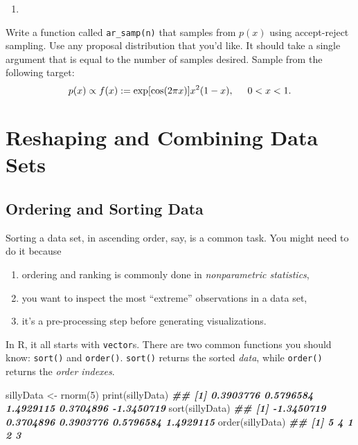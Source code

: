 \documentclass[
  12pt,
  krantz2]{krantz}
\makeatletter
\newenvironment{Shaded}{\begin{snugshade}}{\end{snugshade}}
\newcommand{\DecValTok}[1]{\textcolor[rgb]{0.06,0.06,0.06}{#1}}
\newcommand{\DocumentationTok}[1]{\textcolor[rgb]{0.37,0.37,0.37}{\textbf{\textit{#1}}}}
\newcommand{\FunctionTok}[1]{\textcolor[rgb]{0,0,0}{#1}}
\newcommand{\NormalTok}[1]{#1}
\newcommand{\OtherTok}[1]{\textcolor[rgb]{0.37,0.37,0.37}{#1}}
\providecommand{\tightlist}{%
  \setlength{\itemsep}{0pt}\setlength{\parskip}{0pt}}
\newenvironment{kframe}{%
\medskip{}
\setlength{\fboxsep}{.8em}
 \def\at@end@of@kframe{}%
 \ifinner\ifhmode%
  \def\at@end@of@kframe{\end{minipage}}%
  \begin{minipage}{\columnwidth}%
 \fi\fi%
 \def\FrameCommand##1{\hskip\@totalleftmargin \hskip-\fboxsep
 \colorbox{shadecolor}{##1}\hskip-\fboxsep
     \hskip-\linewidth \hskip-\@totalleftmargin \hskip\columnwidth}%
 \MakeFramed {\advance\hsize-\width
   \@totalleftmargin\z@ \linewidth\hsize
   \@setminipage}}%
 {\par\unskip\endMakeFramed%
 \at@end@of@kframe}
\renewenvironment{Shaded}{\begin{kframe}}{\end{kframe}}
\makeatother
\begin{document}
\begin{enumerate}
\def\labelenumi{\arabic{enumi}.}
\setcounter{enumi}{2}
\tightlist
\item
\end{enumerate}

Write a function called \texttt{ar\_samp(n)} that samples from \(p(x)\) using accept-reject sampling. Use any proposal distribution that you'd like. It should take a single argument that is equal to the number of samples desired. Sample from the following target:
\begin{equation} 
p(x) \propto f(x) := \exp[\cos(2\pi x)] x^2(1-x), \hspace{5mm} 0 < x < 1.
\end{equation}

\hypertarget{reshaping-and-combining-data-sets}{%
\chapter{Reshaping and Combining Data Sets}\label{reshaping-and-combining-data-sets}}

\hypertarget{ordering-and-sorting-data}{%
\section{Ordering and Sorting Data}\label{ordering-and-sorting-data}}

Sorting a data set, in ascending order, say, is a common task. You might need to do it because

\begin{enumerate}
\def\labelenumi{\arabic{enumi}.}
\tightlist
\item
  ordering and ranking is commonly done in \emph{nonparametric statistics},
\item
  you want to inspect the most ``extreme'' observations in a data set,
\item
  it's a pre-processing step before generating visualizations.
\end{enumerate}

In R, it all starts with \texttt{vector}s. There are two common functions you should know: \texttt{sort()} and \texttt{order()}. \texttt{sort()} returns the sorted \emph{data}, while \texttt{order()} returns the \emph{order indexes}.

\begin{Shaded}
\begin{Highlighting}[]
\NormalTok{sillyData }\OtherTok{\textless{}{-}} \FunctionTok{rnorm}\NormalTok{(}\DecValTok{5}\NormalTok{)}
\FunctionTok{print}\NormalTok{(sillyData)}
\DocumentationTok{\#\# [1]  0.3903776  0.5796584  1.4929115  0.3704896 {-}1.3450719}
\FunctionTok{sort}\NormalTok{(sillyData)}
\DocumentationTok{\#\# [1] {-}1.3450719  0.3704896  0.3903776  0.5796584  1.4929115}
\FunctionTok{order}\NormalTok{(sillyData)}
\DocumentationTok{\#\# [1] 5 4 1 2 3}
\end{Highlighting}
\end{Shaded}
\end{document}
